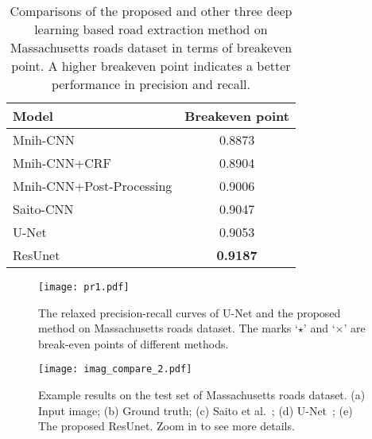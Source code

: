 \documentclass[journal]{IEEEtran}
\begin{document}
\begin{table}[!hbp]
\vspace{-0.2cm}
\begin{center}
\caption{Comparisons of the proposed and other three deep learning based road extraction method on Massachusetts roads dataset in terms of breakeven point. A higher breakeven point indicates a better performance in precision and recall. }
\label{Table:Value at Breakeven Point}
\begin{tabular}{l|c}
\hline
Model & Breakeven point\\
\hline
Mnih-CNN\cite{mnih2010learning} & 0.8873  \\
\hline
Mnih-CNN+CRF\cite{mnih2010learning} & 0.8904  \\
\hline
Mnih-CNN+Post-Processing\cite{mnih2010learning} & 0.9006  \\
\hline
Saito-CNN\cite{Saito2016Multiple} & 0.9047 \\
\hline
U-Net\cite{U-NET2015} & 0.9053 \\
\hline
ResUnet & \textbf{0.9187} \\
\hline
\end{tabular}
\end{center}
\vspace{-0.3cm}
\end{table}


\begin{figure}[!t]
\begin{center}
		\texttt{[image: pr1.pdf]}
	    \caption{The relaxed precision-recall curves of U-Net and the proposed method on Massachusetts roads dataset. The marks `$\star$' and `$\times$' are break-even points of different methods.}
	    \label{Fig:PR}
\end{center}
\vspace{-0.5cm}
\end{figure}

\begin{figure*}[ht]
\begin{center}
		\texttt{[image: imag\_compare\_2.pdf]}
	    \caption{Example results on the test set of Massachusetts roads dataset. (a) Input image; (b) Ground truth; (c) Saito et al.~\cite{Saito2016Multiple}; (d) U-Net~\cite{U-NET2015}; (e) The proposed ResUnet. Zoom in to see more details.}
	    \label{Fig:Result Comparison_0}
\end{center}
\vspace{-0.6cm}
\end{figure*}
\end{document}

